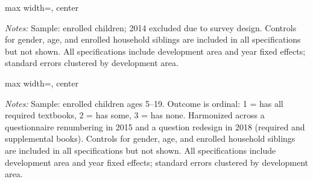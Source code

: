 \documentclass[12pt]{article}
\newcommand*{\TableLagOnePath}{../Paper_3_Tables/Lagged_1Year_Tables}
\begin{document}
		\begin{table}[htbp]
		\centering
		\begin{adjustbox}{max width=\linewidth, center}
		\begin{threeparttable}
			\caption{School Expenditure by Category (Log), IV Estimates}
			\label{tab:expenditures_log}
			{\small}
			\begin{tablenotes}
				\small
				\item \textit{Notes:} Sample: enrolled children; 2014 excluded due to survey design. Controls for gender, age, and enrolled household siblings are included in all specifications but not shown. All specifications include development area and year fixed effects; standard errors clustered by development area.
			\end{tablenotes}
		\end{threeparttable}
		\end{adjustbox}
	\end{table}

	\begin{table}[H]
	\centering
	\begin{adjustbox}{max width=\linewidth, center}
	\begin{threeparttable}
		\caption{Textbook Access, IV Estimates}
		\label{tab:textbooks}
		{\small}
		\begin{tablenotes}
			\small
			\item \textit{Notes:} Sample: enrolled children ages 5--19. Outcome is ordinal: 1 = has all required textbooks, 2 = has some, 3 = has none. Harmonized across a questionnaire renumbering in 2015 and a question redesign in 2018 (required and supplemental books). Controls for gender, age, and enrolled household siblings are included in all specifications but not shown. All specifications include development area and year fixed effects; standard errors clustered by development area.
		\end{tablenotes}
	\end{threeparttable}
	\end{adjustbox}
	\end{table}
\end{document}

